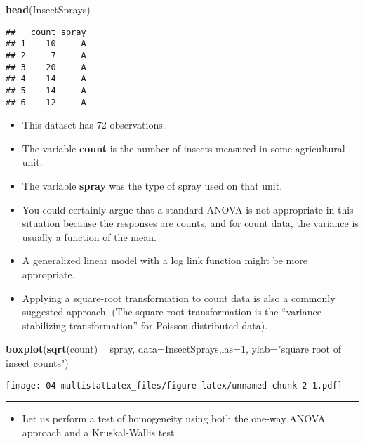 \documentclass[]{book}
\newenvironment{Shaded}{\begin{snugshade}}{\end{snugshade}}
\newcommand{\DataTypeTok}[1]{\textcolor[rgb]{0.13,0.29,0.53}{#1}}
\newcommand{\DecValTok}[1]{\textcolor[rgb]{0.00,0.00,0.81}{#1}}
\newcommand{\KeywordTok}[1]{\textcolor[rgb]{0.13,0.29,0.53}{\textbf{#1}}}
\newcommand{\NormalTok}[1]{#1}
\newcommand{\OperatorTok}[1]{\textcolor[rgb]{0.81,0.36,0.00}{\textbf{#1}}}
\newcommand{\StringTok}[1]{\textcolor[rgb]{0.31,0.60,0.02}{#1}}
\providecommand{\tightlist}{%
  \setlength{\itemsep}{0pt}\setlength{\parskip}{0pt}}
\begin{document}
\begin{Shaded}
\begin{Highlighting}[]
\KeywordTok{head}\NormalTok{(InsectSprays)}
\end{Highlighting}
\end{Shaded}

\begin{verbatim}
##   count spray
## 1    10     A
## 2     7     A
## 3    20     A
## 4    14     A
## 5    14     A
## 6    12     A
\end{verbatim}

\begin{itemize}
\item
  This dataset has 72 observations.
\item
  The variable \textbf{count} is the number of
  insects measured in some agricultural unit.
\item
  The variable \textbf{spray} was the type of spray used on
  that unit.
\item
  You could certainly argue that a standard ANOVA is not
  appropriate in this situation because the responses are counts,
  and for count data, the variance is usually a function of the mean.
\item
  A generalized linear model with a log link function might be more appropriate.
\item
  Applying a square-root transformation to count data is also a commonly suggested
  approach. (The square-root transformation is the ``variance-stabilizing transformation''
  for Poisson-distributed data).
\end{itemize}

\begin{Shaded}
\begin{Highlighting}[]
\KeywordTok{boxplot}\NormalTok{(}\KeywordTok{sqrt}\NormalTok{(count) }\OperatorTok{~}\StringTok{ }\NormalTok{spray, }\DataTypeTok{data=}\NormalTok{InsectSprays,}\DataTypeTok{las=}\DecValTok{1}\NormalTok{, }
        \DataTypeTok{ylab=}\StringTok{"square root of insect counts"}\NormalTok{)}
\end{Highlighting}
\end{Shaded}

\texttt{[image: 04-multistatLatex\_files/figure-latex/unnamed-chunk-2-1.pdf]}

\begin{center}\rule{0.5\linewidth}{\linethickness}\end{center}

\begin{itemize}
\tightlist
\item
  Let us perform a test of homogeneity using both the one-way ANOVA approach and a Kruskal-Wallis
  test
\end{itemize}
\end{document}
